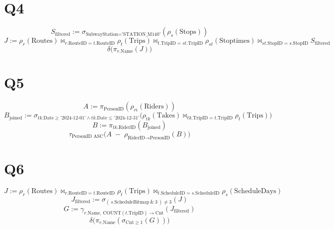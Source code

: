 \documentclass{article}
\begin{document}
\section{Q4}
\begin{dmath*}
S_{\text{filtered}} := \sigma_{\text{SubwayStation}=\text{'STATION\_M140'}}(\rho_{s}(\text{Stops}))
\end{dmath*}
\begin{dmath*}
J := \rho_{r}(\text{Routes})
  \bowtie_{r.\text{RouteID}=t.\text{RouteID}} \rho_{t}(\text{Trips})
  \bowtie_{t.\text{TripID}=st.\text{TripID}} \rho_{st}(\text{Stoptimes})
  \bowtie_{st.\text{StopID}=s.\text{StopID}} S_{\text{filtered}}
\end{dmath*}
\begin{dmath*}
\delta\big(\pi_{r.\text{Name}}(J)\big)
\end{dmath*}

\section{Q5}
\begin{dmath*}
A := \pi_{\text{PersonID}}(\rho_{ri}(\text{Riders}))
\end{dmath*}
\begin{dmath*}
B_{\text{joined}} := 
  \sigma_{tk.\text{Date}\ge \text{'2024-12-01'} \wedge tk.\text{Date}\le \text{'2024-12-31'}}\big(
    \rho_{tk}(\text{Takes}) \bowtie_{tk.\text{TripID}=t.\text{TripID}} \rho_{t}(\text{Trips})
  \big)
\end{dmath*}
\begin{dmath*}
B := \pi_{tk.\text{RiderID}}(B_{\text{joined}})
\end{dmath*}
\begin{dmath*}
\tau_{\text{PersonID ASC}}\Big(A \;-\; \rho_{\text{RiderID}\rightarrow\text{PersonID}}(B)\Big)
\end{dmath*}

\section{Q6}
\begin{dmath*}
J := \rho_{r}(\text{Routes})
  \bowtie_{r.\text{RouteID}=t.\text{RouteID}} \rho_{t}(\text{Trips})
  \bowtie_{t.\text{ScheduleID}=s.\text{ScheduleID}} \rho_{s}(\text{ScheduleDays})
\end{dmath*}
\begin{dmath*}
J_{\text{filtered}} := \sigma_{(\,s.\text{ScheduleBitmap}\ \mathbin{\&}\ 3\,)\neq 3}(J)
\end{dmath*}
\begin{dmath*}
G := \gamma_{r.\text{Name},\,\text{COUNT}(t.\text{TripID})\rightarrow \text{Cnt}}(J_{\text{filtered}})
\end{dmath*}
\begin{dmath*}
\delta\big(\pi_{r.\text{Name}}(\sigma_{\text{Cnt}\ge 1}(G))\big)
\end{dmath*}
\end{document}
